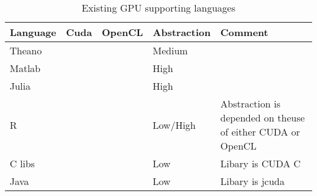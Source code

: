 \begin{table}
	\center
	\begin{tabular}{|l|c|c|l|l|}
	\hline
	\textbf{Language} & \textbf{Cuda}         & \textbf{OpenCL} & \textbf{Abstraction} & \textbf{Comment}			  		\\ \hline
	Theano   & \cmark           & \cmark            & Medium      &                                                            \\ \hline
	Matlab   & \cmark           & \cmark            & High        &                                                            \\ \hline
	Julia    & \cmark           &               & High        &                                                            \\ \hline
	R        & \cmark           & \cmark            & Low/High    & Abstraction is depended on theuse of either CUDA or OpenCL \\ \hline
	C libs   & \cmark           & \cmark            & Low         & Libary is CUDA C                                           \\ \hline
	Java     & \cmark           &               &   Low          & Libary is jcuda                                            \\ \hline
	\end{tabular}
	\caption{Existing GPU supporting languages}
	\label{gpu-pls}
\end{table}
